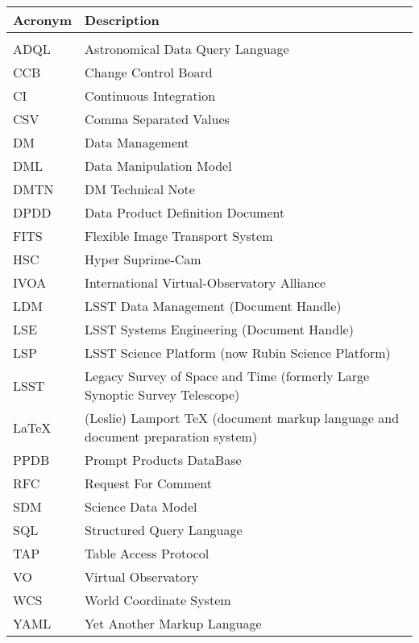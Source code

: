 \addtocounter{table}{-1}
\begin{longtable}{p{}p{}}\hline
\textbf{Acronym} & \textbf{Description}  \\\hline

 &  \\\hline
ADQL & Astronomical Data Query Language \\\hline
CCB & Change Control Board \\\hline
CI & Continuous Integration \\\hline
CSV & Comma Separated Values \\\hline
DM & Data Management \\\hline
DML & Data Manipulation Model \\\hline
DMTN & DM Technical Note \\\hline
DPDD & Data Product Definition Document \\\hline
FITS & Flexible Image Transport System \\\hline
HSC & Hyper Suprime-Cam \\\hline
IVOA & International Virtual-Observatory Alliance \\\hline
LDM & LSST Data Management (Document Handle) \\\hline
LSE & LSST Systems Engineering (Document Handle) \\\hline
LSP & LSST Science Platform (now Rubin Science Platform) \\\hline
LSST & Legacy Survey of Space and Time (formerly Large Synoptic Survey Telescope) \\\hline
LaTeX & (Leslie) Lamport TeX (document markup language and document preparation system) \\\hline
PPDB & Prompt Products DataBase \\\hline
RFC & Request For Comment \\\hline
SDM & Science Data Model \\\hline
SQL & Structured Query Language \\\hline
TAP & Table Access Protocol \\\hline
VO & Virtual Observatory \\\hline
WCS & World Coordinate System \\\hline
YAML & Yet Another Markup Language \\\hline
\end{longtable}
